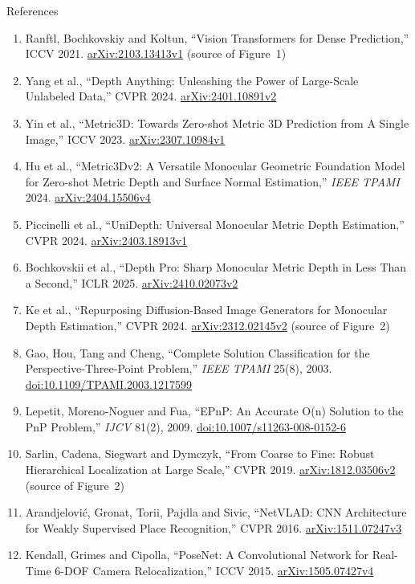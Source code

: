 \begin{frame}[allowframebreaks]{References}
\begin{enumerate}
    \item Ranftl, Bochkovskiy and Koltun, ``Vision Transformers for Dense Prediction,'' ICCV 2021. \href{https://arxiv.org/abs/2103.13413v1}{arXiv:2103.13413v1} (source of Figure~1)
    \item Yang et al., ``Depth Anything: Unleashing the Power of Large-Scale Unlabeled Data,'' CVPR 2024. \href{https://arxiv.org/abs/2401.10891v2}{arXiv:2401.10891v2}
    \item Yin et al., ``Metric3D: Towards Zero-shot Metric 3D Prediction from A Single Image,'' ICCV 2023. \href{https://arxiv.org/abs/2307.10984v1}{arXiv:2307.10984v1}
    \item Hu et al., ``Metric3Dv2: A Versatile Monocular Geometric Foundation Model for Zero-shot Metric Depth and Surface Normal Estimation,'' \emph{IEEE TPAMI} 2024. \href{https://arxiv.org/abs/2404.15506v4}{arXiv:2404.15506v4}
    \item Piccinelli et al., ``UniDepth: Universal Monocular Metric Depth Estimation,'' CVPR 2024. \href{https://arxiv.org/abs/2403.18913v1}{arXiv:2403.18913v1}
    \item Bochkovskii et al., ``Depth Pro: Sharp Monocular Metric Depth in Less Than a Second,'' ICLR 2025. \href{https://arxiv.org/abs/2410.02073v2}{arXiv:2410.02073v2}
    \item Ke et al., ``Repurposing Diffusion-Based Image Generators for Monocular Depth Estimation,'' CVPR 2024. \href{https://arxiv.org/abs/2312.02145v2}{arXiv:2312.02145v2} (source of Figure~2)
    \item Gao, Hou, Tang and Cheng, ``Complete Solution Classification for the Perspective-Three-Point Problem,'' \emph{IEEE TPAMI} 25(8), 2003. \href{https://doi.org/10.1109/TPAMI.2003.1217599}{doi:10.1109/TPAMI.2003.1217599}
    \item Lepetit, Moreno-Noguer and Fua, ``EPnP: An Accurate O(n) Solution to the PnP Problem,'' \emph{IJCV} 81(2), 2009. \href{https://doi.org/10.1007/s11263-008-0152-6}{doi:10.1007/s11263-008-0152-6}
    \item Sarlin, Cadena, Siegwart and Dymczyk, ``From Coarse to Fine: Robust Hierarchical Localization at Large Scale,'' CVPR 2019. \href{https://arxiv.org/abs/1812.03506v2}{arXiv:1812.03506v2} (source of Figure~2)
    \item Arandjelovi\'c, Gronat, Torii, Pajdla and Sivic, ``NetVLAD: CNN Architecture for Weakly Supervised Place Recognition,'' CVPR 2016. \href{https://arxiv.org/abs/1511.07247v3}{arXiv:1511.07247v3}
    \item Kendall, Grimes and Cipolla, ``PoseNet: A Convolutional Network for Real-Time 6-DOF Camera Relocalization,'' ICCV 2015. \href{https://arxiv.org/abs/1505.07427v4}{arXiv:1505.07427v4}

\end{enumerate}
\end{frame}
